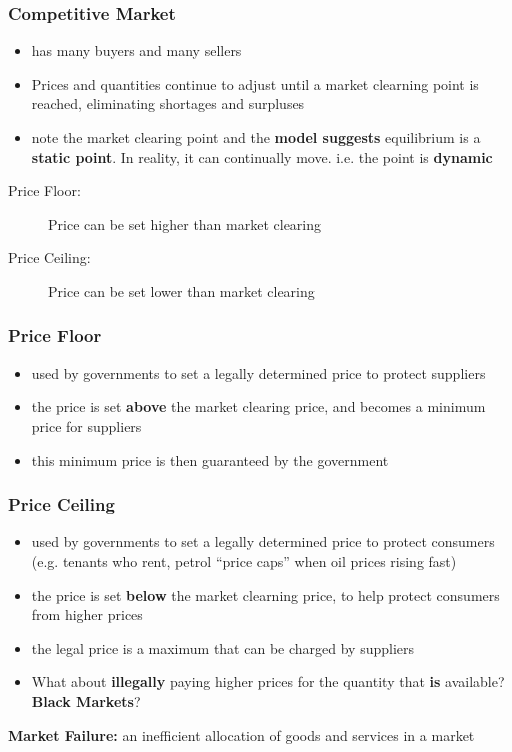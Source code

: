 \subsubsection{Competitive Market}
\begin{itemize}
	\item has many buyers and many sellers
	\item Prices and quantities continue to adjust until a market clearning point is reached, eliminating shortages and surpluses
	\item note the market clearing point and the \textbf{model suggests} equilibrium is a \textbf{static point}. In reality, it can continually move. i.e. the point is \textbf{dynamic}
\end{itemize}
\begin{description}
	\item[Price Floor:] Price can be set higher than market clearing
	\item[Price Ceiling:] Price can be set lower than market clearing
\end{description}
\subsubsection{Price Floor}
\begin{itemize}
	\item used by governments to set a legally determined price to protect suppliers
	\item the price is set \textbf{above} the market clearing price, and becomes a minimum price for suppliers
	\item this minimum price is then guaranteed by the government
\end{itemize}
\subsubsection{Price Ceiling}
\begin{itemize}
	\item used by governments to set a legally determined price to protect consumers (e.g. tenants who rent, petrol ``price caps'' when oil prices rising fast)
	\item the price is set \textbf{below} the market clearning price, to help protect consumers from higher prices
	\item the legal price is a maximum that can be charged by suppliers
	\item What about \textbf{illegally} paying higher prices for the quantity that \textbf{is} available? \textbf{Black Markets}?
\end{itemize}
\textbf{Market Failure:} an inefficient allocation of goods and services in a market


